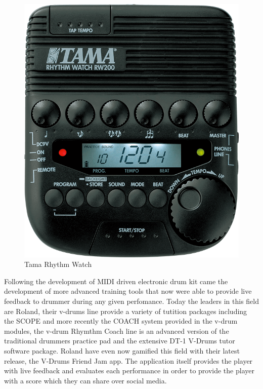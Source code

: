 \documentclass[a4paper, 11pt]{article}
\begin{document}
\begin{figure}[ht]
	\centering
	\includegraphics[scale=0.25]{RW200}
	\caption{Tama Rhythm Watch}%
	\label{fig: RW200}
\end{figure}

Following the development of MIDI driven electronic drum kit came the development of more advanced training tools that now were able to provide live feedback to drummer during any given perfomance. Today the leaders in this field are Roland, their v-drums line provide a variety of tutition packages including the SCOPE and more recently the COACH system provided in the v-drum modules, the v-drum Rhymthm Coach line is an advanced version of the traditional drummers practice pad and the extensive DT-1 V-Drums tutor software package. Roland have even now gamified this field with their latest release, the V-Drums Friend Jam app. The application itself provides the player with live feedback and evaluates each performance in order to provide the player with a score which they can share over social media. \par
\end{document}
